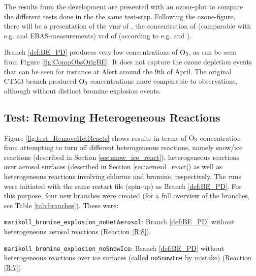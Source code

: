 \medskip

The results from the development are presented with an ozone-plot to compare the different tests done in the the same test-step. Following the ozone-figure, there will be a presentation of the \acrlong{vmr} of , the concentration of  (comparable with e.g. \cite{barrie} and EBAS-measurements) \acrlong{vcd} of  (according to e.g. \cite{Peterson2015} and \cite{Simpson2017}).

\medskip

Branch \ref{def:BE_PD} produces very low concentrations of $\mathrm{O_3}$, as can be seen from Figure \ref{fig:CompObsOrigBE}. It does not capture the ozone depletion events that can be seen for instance at Alert around the 9th of April. The original CTM3 branch produced $\mathrm{O_3}$ concentrations more comparable to observations, although without distinct bromine explosion events. 





\subsection{Test: Removing Heterogeneous Reactions}

Figure \ref{fig:test_RemoveHetReacts} shows results in terms of $\mathrm{O_3}$-concentration from attempting to turn off different heterogeneous reactions, namely snow/ice reactions (described in Section \ref{sec:snow_ice_react}), heterogeneous reactions over aerosol surfaces (described in Section \ref{sec:aerosol_react}) as well as heterogeneous reactions involving chlorine and bromine, respectively. The runs were initiated with the same restart file (spin-up) as Branch \ref{def:BE_PD}. For this purpose, four new branches were created (for a full overview of the branches, see Table \ref{tab:branches}). These were:

\begin{mydef}\label{def:BE_PD_noAerosol}
    \texttt{marikoll\_bromine\_explosion\_noHetAerosol}: Branch \ref{def:BE_PD} without heterogeneous aerosol reactions (Reaction \ref{R:8}). 
\end{mydef}

\begin{mydef}\label{def:BE_PD_noIce}
    \texttt{marikoll\_bromine\_explosion\_noSnowIce}: Branch \ref{def:BE_PD} without heterogeneous reactions over ice surfaces (called \texttt{noSnowIce} by mistake) (Reaction \ref{R:7}).
\end{mydef}

